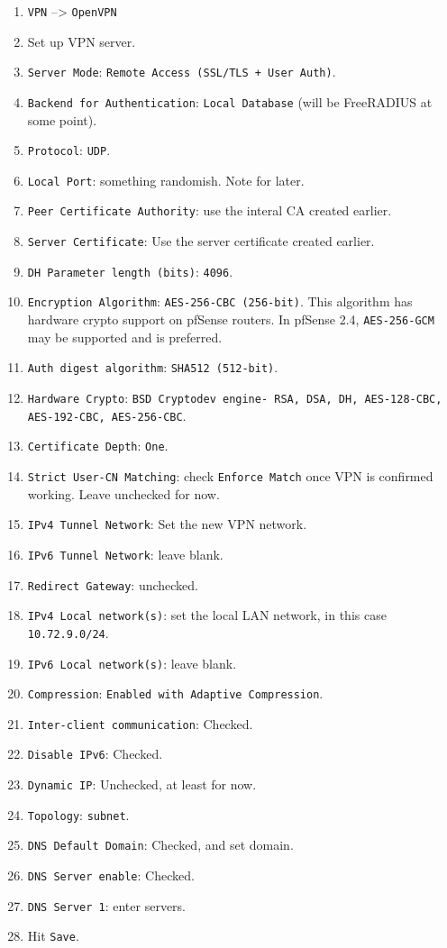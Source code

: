 \begin{enumerate}
 \item \texttt{VPN} --> \texttt{OpenVPN}
 \item Set up VPN server.
 \item \texttt{Server Mode}: \texttt{Remote Access (SSL/TLS + User Auth)}.
 \item \texttt{Backend for Authentication}: \texttt{Local Database} (will be FreeRADIUS at some point).
 \item \texttt{Protocol}: \texttt{UDP}.
 \item \texttt{Local Port}: something randomish. Note for later.
 \item \texttt{Peer Certificate Authority}: use the interal CA created earlier.
 \item \texttt{Server Certificate}: Use the server certificate created earlier.
 \item \texttt{DH Parameter length (bits)}: \texttt{4096}.
 \item \texttt{Encryption Algorithm}: \texttt{AES-256-CBC (256-bit)}. This algorithm has hardware crypto support on pfSense routers. In pfSense 2.4, \texttt{AES-256-GCM} may be supported and is preferred.
 \item \texttt{Auth digest algorithm}: \texttt{SHA512 (512-bit)}.
 \item \texttt{Hardware Crypto}: \texttt{BSD Cryptodev engine- RSA, DSA, DH, AES-128-CBC, AES-192-CBC, AES-256-CBC}.
 \item \texttt{Certificate Depth}: \texttt{One}.
 \item \texttt{Strict User-CN Matching}: check \texttt{Enforce Match} once VPN is confirmed working. Leave unchecked for now.
 \item \texttt{IPv4 Tunnel Network}: Set the new VPN network.
 \item \texttt{IPv6 Tunnel Network}: leave blank.
 \item \texttt{Redirect Gateway}: unchecked.
 \item \texttt{IPv4 Local network(s)}: set the local LAN network, in this case \texttt{10.72.9.0/24}.
 \item \texttt{IPv6 Local network(s)}: leave blank.
 \item \texttt{Compression}: \texttt{Enabled with Adaptive Compression}.
 \item \texttt{Inter-client communication}: Checked.
 \item \texttt{Disable IPv6}: Checked.
 \item \texttt{Dynamic IP}: Unchecked, at least for now.
 \item \texttt{Topology}: \texttt{subnet}.
 \item \texttt{DNS Default Domain}: Checked, and set domain.
 \item \texttt{DNS Server enable}: Checked.
 \item \texttt{DNS Server 1}: enter servers.
 \item Hit \texttt{Save}.
\end{enumerate}

